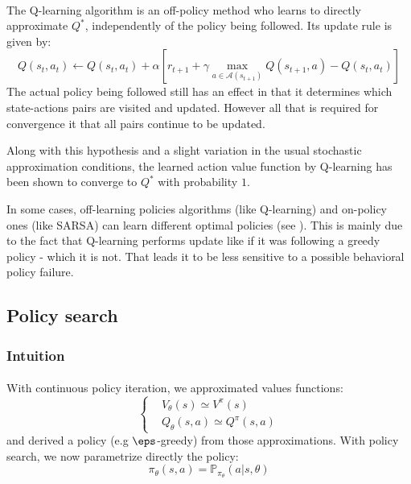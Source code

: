 {{{{				\paragraph{} The Q-learning algorithm is an off-policy method who learns to directly approximate $Q^*$, independently of the policy being followed. Its update rule is given by:
				\begin{equation}
					Q(s_t,a_t) \leftarrow Q(s_t,a_t) + \alpha \left[ r_{t+1} + \gamma \max_{a\in\mathcal{A}(s_{t+1})} Q(s_{t+1},a) - Q(s_t,a_t)\right]
				\end{equation}
				The actual policy being followed still has an effect in that it determines which state-actions pairs are visited and updated. However all that is required for convergence it that all pairs continue to be updated. 
				
				Along with this hypothesis and a slight variation in the usual stochastic approximation conditions, the learned action value function by Q-learning has been shown to converge to $Q^*$ with probability $1$. 
				
				In some cases, off-learning policies algorithms (like Q-learning) and on-policy ones (like SARSA) can learn different optimal policies (see \cite{sutton1998reinforcement}). This is mainly due to the fact that Q-learning performs update like if it was following a greedy policy - which it is not. That leads it to be less sensitive to a possible behavioral policy failure. 
			}
}
			
			\subsection{Policy search}
			{
				\label{sec::rlps}
				\subsubsection{Intuition}
				{
			\paragraph{} With continuous policy iteration, we approximated values functions:
			\begin{equation}
			\left\{
				\begin{aligned}
					&V_\theta(s) \simeq V^\pi(s) \\
					&Q_\theta(s,a) \simeq Q^\pi(s,a)
				\end{aligned}\right.
			\end{equation}
			and derived a policy (e.g $\eps$-greedy) from those approximations. With policy search, we now parametrize directly the policy:
			\begin{equation}
				\pi_\theta (s,a) = \mathbb{P}_{\pi_\theta}(a\vert s,\theta)
			\end{equation}
			
}}}}
